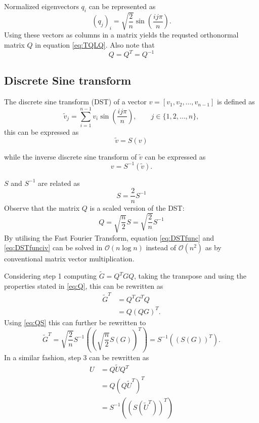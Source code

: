 \documentclass[11pt,a4paper,english]{article}
\numberwithin{figure}{subsection}
\numberwithin{table}{subsection}
\begin{document}
Normalized eigenvectors $q_i$ can be represented as 
\begin{equation}
	\label{eq:normeigvec}
	(q_j)_i = \sqrt{\frac{2}{n}}\sin\left(\frac{ij\pi}{n}\right).
\end{equation} 
Using these vectors as columns in a matrix yields the requsted orthonormal matrix $Q$ in equation \eqref{eq:TQLQ}. Also note that
\begin{equation}
	\label{eq:Q}
	Q = Q^T = Q^{-1}
\end{equation}
	

\subsection{Discrete Sine transform}
The discrete sine transform (DST) of a vector $v=[v_1,v_2,\dots,v_{n-1}]$ is defined as
\begin{equation}
	\label{eq:DST}
	\tilde{v}_j = \sum_{i=1}^{n-1}v_i\sin\left(\frac{ij\pi}{n}\right), \qquad j \in \{1,2,\dots,n\},
\end{equation}
this can be expressed as 
\begin{equation}
	\label{eq:DSTfunc}
	\tilde{v} = S(v)
\end{equation}
	
while the inverse discrete sine transform of $\tilde{v}$ can be expressed as
\begin{equation}
	\label{eq:DSTfunciv}
	v = S^{-1}(\tilde{v}).
\end{equation}
	
$S$ and $S^{-1}$ are related as
\[
	S = \frac{2}{n}S^{-1}
\]
Observe that the matrix $Q$ is a scaled version of the DST:
\begin{equation}
	\label{eq:QS}
	Q = \sqrt{\frac{n}{2}}S = \sqrt{\frac{2}{n}}S^{-1}
\end{equation}
By utilising the Fast Fourier Transform, equation \eqref{eq:DSTfunc} and \eqref{eq:DSTfunciv} can be solved in $\mathcal{O}(n\log n)$ instead of $\mathcal{O}(n^2)$ as by conventional matrix vector multiplication.

Considering step 1 computing $\widetilde{G} = Q^TGQ$, taking the transpose and using the properties stated in \eqref{eq:Q}, this can be rewritten as
\begin{align*}
	\widetilde{G}^T	&= Q^TG^TQ \\
					&= Q(QG)^T.
\end{align*}
Using \eqref{eq:QS} this can further be rewritten to
\begin{equation}
	\widetilde{G}^T = \sqrt{\frac{2}{n}}S^{-1}\left(\left(\sqrt{\frac{n}{2}}S(G)\right)^T\right) = S^{-1}\left(\left(S(G)\right)^T\right).
\end{equation}
In a similar fashion, step 3 can be rewritten as
\begin{align*}
	U	&= Q\widetilde{U}Q^T \\
		&= Q(Q\widetilde{U}^T)^T \\
		&= S^{-1}\left((S(\widetilde{U}^T))^T\right)
\end{align*}
\end{document}
